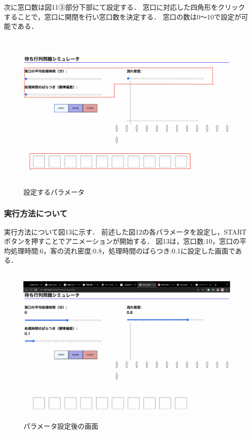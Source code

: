 \documentclass[12pt,a4j]{ltjsarticle}
\begin{document}
次に窓口数は図11③部分下部にて設定する．
窓口に対応した四角形をクリックすることで，窓口に開閉を行い窓口数を決定する．
窓口の数は0〜10で設定が可能である．
\begin{figure}[h]
\begin{center}
\includegraphics[height = 80mm ] {figures/lay2.pdf}
\caption{設定するパラメータ}
\end{center}
\label{fig:layout_ex}
\end{figure}

\clearpage

\subsubsection{実行方法について}
実行方法について図13に示す．
前述した図12の各パラメータを設定し，STARTボタンを押すことでアニメーションが開始する．
図13は，窓口数:10，窓口の平均処理時間:6，客の流れ密度:0.8，処理時間のばらつき:0.1に設定した画面である．
\begin{figure}[h]
\begin{center}
\includegraphics[height = 80mm ] {figures/lay_para.pdf}
\caption{パラメータ設定後の画面}
\end{center}
\label{fig:layout_ex}
\end{figure}
\end{document}
